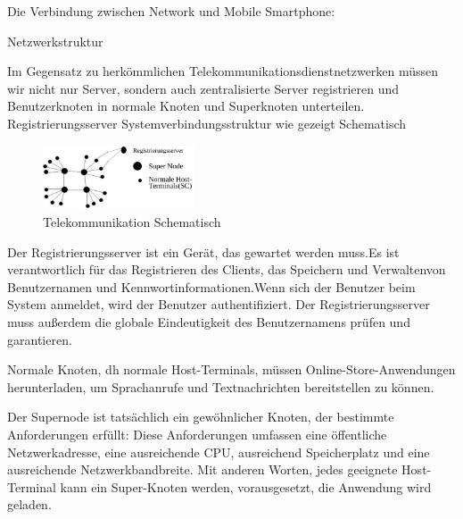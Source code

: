 Die Verbindung zwischen Network und Mobile Smartphone:

Netzwerkstruktur

Im Gegensatz zu herkömmlichen Telekommunikationsdienstnetzwerken müssen wir nicht nur Server, sondern auch zentralisierte Server registrieren und Benutzerknoten in normale Knoten und Superknoten unterteilen. Registrierungsserver Systemverbindungsstruktur wie gezeigt Schematisch

\begin{figure}[htbp]
	\centering
	\includegraphics[width=0.4\textwidth]{bilder/telekommunikation-schema.png}
	\caption{Telekommunikation Schematisch}
	\label{fig:wursthund}
\end{figure}

Der Registrierungsserver ist ein Gerät, das gewartet werden muss.Es ist verantwortlich für das Registrieren des Clients, das Speichern und Verwaltenvon Benutzernamen und Kennwortinformationen.Wenn sich der Benutzer beim System anmeldet, wird der Benutzer authentifiziert. Der Registrierungsserver muss außerdem die globale Eindeutigkeit des Benutzernamens prüfen und garantieren.

Normale Knoten, dh normale Host-Terminals, müssen Online-Store-Anwendungen herunterladen, um Sprachanrufe und Textnachrichten bereitstellen zu können.

Der Supernode ist tatsächlich ein gewöhnlicher Knoten, der bestimmte Anforderungen erfüllt: Diese Anforderungen umfassen eine öffentliche Netzwerkadresse, eine ausreichende CPU, ausreichend Speicherplatz und eine ausreichende Netzwerkbandbreite. Mit anderen Worten, jedes geeignete Host-Terminal kann ein Super-Knoten werden, vorausgesetzt, die Anwendung wird geladen.
